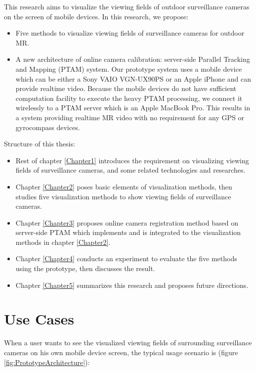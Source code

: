 This research aims to visualize the viewing fields of outdoor surveillance cameras on the screen of mobile devices. In this research, we propose:

\begin{itemize}
	\item Five methods to visualize viewing fields of surveillance cameras for outdoor MR.
	\item A new architecture of online camera calibration: server-side Parallel Tracking and Mapping (PTAM) \cite{Reference12} system. Our prototype system uses a mobile device which can be either a Sony VAIO VGN-UX90PS or an Apple iPhone and can provide realtime video. Because the mobile devices do not have sufficient computation facility to execute the heavy PTAM processing, we connect it wirelessly to a PTAM server which is an Apple MacBook Pro. This results in a system providing realtime MR video with no requirement for any GPS or gyrocompass devices.
\end{itemize}

Structure of this thesis:

\begin{itemize}
	\item Rest of chapter \ref{Chapter1} introduces the requirement on visualizing viewing fields of surveillance cameras, and some related technologies and researches.
	\item Chapter \ref{Chapter2} poses basic elements of visualization methods, then studies five visualization methods to show viewing fields of surveillance cameras.
	\item Chapter \ref{Chapter3} proposes online camera registration method based on server-side PTAM which implements and is integrated to the visualization methods in chapter \ref{Chapter2}.
	\item Chapter \ref{Chapter4} conducts an experiment to evaluate the five methods using the prototype, then discusses the result.
	\item Chapter \ref{Chapter5} summarizes this research and proposes future directions.
\end{itemize}


\section{Use Cases}
\label{UseCases}

When a user wants to see the visualized viewing fields of surrounding surveillance cameras on his own mobile device screen, the typical usage scenario is (figure \ref{fig:PrototypeArchitecture}):

